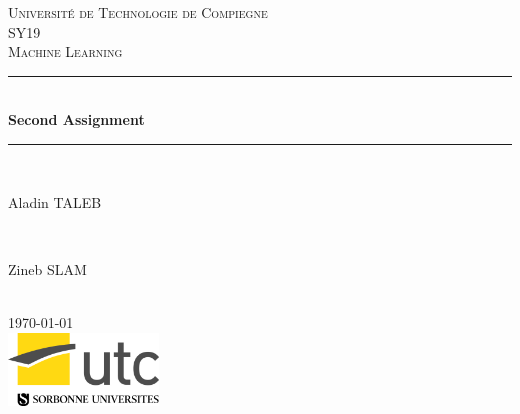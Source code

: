 \documentclass[]{report}
\begin{document}
	
\begin{titlepage}
	
	\newcommand{\HRule}{\rule{\linewidth}{0.5mm}} 
	
	\center 
	
	\textsc{\LARGE Université de Technologie de Compiegne}\\[1.5cm]
	\textsc{\Large SY19}\\[0.5cm] 
	\textsc{\large Machine Learning}\\[0.5cm]
		
	\HRule \\[0.4cm]
	{ \huge \bfseries Second Assignment}\\[0.4cm] 
	\HRule \\[1.5cm]
		
	\begin{minipage}{0.4\textwidth}
		\begin{flushleft} \large
			Aladin \textsc{TALEB} 
		\end{flushleft}
	\end{minipage}
	~
	\begin{minipage}{0.4\textwidth}
		\begin{flushright} \large
			Zineb \textsc{SLAM} 
		\end{flushright}
	\end{minipage}\\[2cm]

	{\large \today}\\[2cm] 

	\includegraphics[width=40mm]{Figures/utc.jpg}\\ %

	\vfill
	
\end{titlepage}


	

\begin{abstract}
	

\end{abstract}
\end{document}
